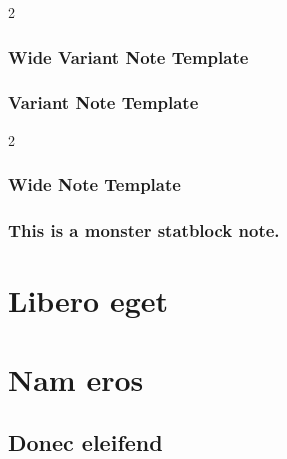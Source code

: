   \begin{hbNoteWide2}
  \begin{multicols}{2}
  \subsubsection*{Wide Variant Note Template}
  \noindent\lipsum[11-13]
  \end{multicols}
  \end{hbNoteWide2}

  \lipsum[4-12]


  \begin{hbNote2}[b]
  \subsubsection*{Variant Note Template}
  \noindent\lipsum[106]
  \end{hbNote2}

  \begin{hbNoteWide}[b]
  \begin{multicols}{2}
  \subsubsection*{Wide Note Template}
  \noindent\lipsum[13-14]
  \end{multicols}
  \end{hbNoteWide}

   \lipsum[110-111]

  \begin{hbMonsterNote}
  \subsubsection*{This is a monster statblock note.}
  \noindent\lipsum[16]
  \end{hbMonsterNote}

  \lipsum[112-115]

  \section*{Libero eget} \lipsum[116-118]
  \section*{Nam eros} \lipsum[119-120]

  \subsection*{Donec eleifend} \lipsum[120-121]
